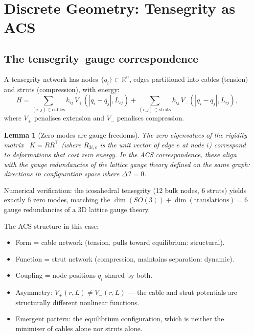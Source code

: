 \documentclass[11pt,a4paper]{article}
\theoremstyle{plain}
\newtheorem{lemma}[theorem]{Lemma}
\theoremstyle{definition}
\theoremstyle{remark}
\newcommand{\DI}{\Delta\mathcal{I}}
\begin{document}
\section{Discrete Geometry: Tensegrity as ACS}
\label{sec:tensegrity}

\subsection{The tensegrity--gauge correspondence}

A tensegrity network has nodes $\{q_i\} \subset \mathbb{R}^n$, edges 
partitioned into cables (tension) and struts (compression), with energy:
\begin{equation}
  H = \sum_{(i,j)\in\mathrm{cables}} k_{ij}\,V_+(|q_i-q_j|, L_{ij})
    + \sum_{(i,j)\in\mathrm{struts}} k_{ij}\,V_-(|q_i-q_j|, L_{ij}),
\end{equation}
where $V_+$ penalises extension and $V_-$ penalises compression.

\begin{lemma}[Zero modes are gauge freedoms]\label{lem:zero-modes}
The zero eigenvalues of the rigidity matrix~\cite{Connelly1996} $K = R R^\top$ 
(where $R_{3i, e}$ is the unit vector of edge $e$ at node $i$) correspond to 
deformations that cost zero energy.  In the ACS correspondence, these
align with the gauge redundancies of the lattice gauge theory defined on
the same graph: directions in configuration space where $\DI = 0$.
\end{lemma}

\noindent
Numerical verification: the icosahedral tensegrity (12 bulk nodes, 6 struts) 
yields exactly 6 zero modes, matching the $\dim(SO(3)) + \dim(\mathrm{translations}) = 6$ 
gauge redundancies of a 3D lattice gauge theory.

The ACS structure in this case:
\begin{itemize}[noitemsep]
  \item Form = cable network (tension, pulls toward equilibrium: structural).
  \item Function = strut network (compression, maintains separation: dynamic).
  \item Coupling = node positions $q_i$ shared by both.
  \item Asymmetry: $V_+(r,L) \neq V_-(r,L)$ --- the cable and strut potentials 
    are structurally different nonlinear functions.
  \item Emergent pattern: the equilibrium configuration, which is 
    neither the minimiser of cables alone nor struts alone.
\end{itemize}
\end{document}
